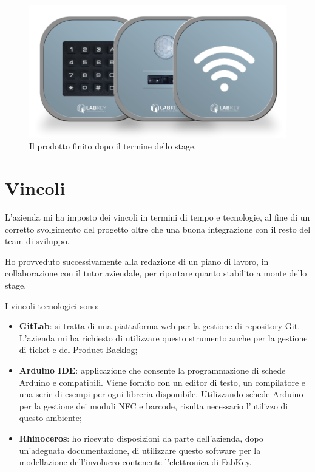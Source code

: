 \begin{figure}[H]
	\begin{center}
	\includegraphics[scale=0.29]{immagini/fabkey_dopo.png}
	\caption{Il prodotto finito dopo il termine dello stage.}
	\end{center}
\end{figure}

\section{Vincoli}
L'azienda mi ha imposto dei vincoli in termini di tempo e tecnologie, al fine di un corretto svolgimento del progetto oltre che una buona integrazione con il resto del team di sviluppo. 

Ho provveduto successivamente alla redazione di un piano di lavoro, in collaborazione con il tutor aziendale, per riportare quanto stabilito a monte dello stage.

I vincoli tecnologici sono:
\begin{itemize}
\item \textbf{GitLab}: si tratta di una piattaforma web per la gestione di repository Git. L'azienda mi ha richiesto di utilizzare questo strumento anche per la gestione di ticket e del Product Backlog;
\item \textbf{Arduino IDE}: applicazione che consente la programmazione di schede Arduino e compatibili. Viene fornito con un editor di testo, un compilatore e una serie di esempi per ogni libreria disponibile. Utilizzando schede Arduino per la gestione dei moduli NFC e barcode, risulta necessario l'utilizzo di questo ambiente;
\item \textbf{Rhinoceros}: ho ricevuto disposizioni da parte dell'azienda, dopo un'adeguata documentazione, di utilizzare questo software per la modellazione dell'involucro contenente l'elettronica di FabKey.
\end{itemize}

